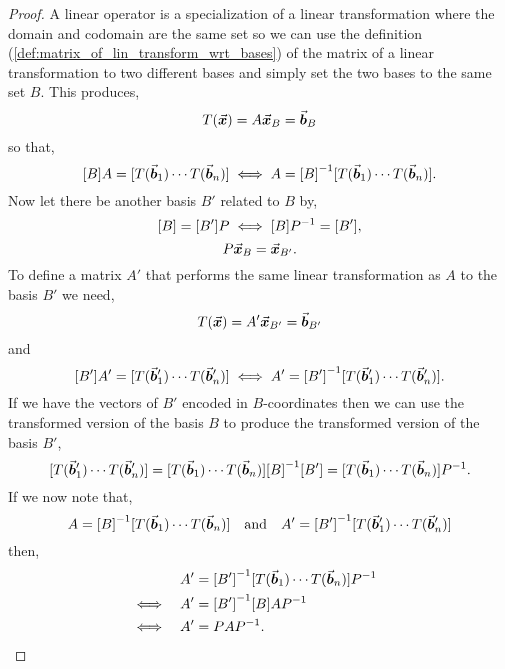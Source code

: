 \documentclass[../MathsNotesBase.tex]{subfiles}
\begin{document}
{		
		\bigskip
		\begin{proof}
			A linear operator is a specialization of a linear transformation where the domain and codomain are the same set so we can use the definition (\ref{def:matrix_of_lin_transform_wrt_bases}) of the matrix of a linear transformation \wrt to two different bases and simply set the two bases to the same set $B$. This produces,
			\[ T(\vec{\bm{x}}) = A\vec{\bm{x}}_B = \vec{\bm{b}}_B \]
			so that,
			\[ [B]A = [T(\vec{\bm{b}}_1) \cdots T(\vec{\bm{b}}_n)] \iff A = {[B]}^{-1}[T(\vec{\bm{b}}_1) \cdots T(\vec{\bm{b}}_n)]. \]		
			Now let there be another basis $B'$ related to $B$ by,
			\[ [B] = [B']P \iff [B]{P}^{-1} = [B'], \]
			\[ P\vec{\bm{x}}_B = \vec{\bm{x}}_{B'}. \]
			To define a matrix $A'$ that performs the same linear transformation as $A$ \wrt to the basis $B'$ we need,
			\[ T(\vec{\bm{x}}) = A'\vec{\bm{x}}_{B'} = \vec{\bm{b}}_{B'} \]
			and
			\[ [B']A' = [T(\vec{\bm{b}}_1') \cdots T(\vec{\bm{b}}_n')] \iff A' = {[B']}^{-1}[T(\vec{\bm{b}}_1') \cdots T(\vec{\bm{b}}_n')]. \]
			If we have the vectors of $B'$ encoded in $B$-coordinates then we can use the transformed version of the basis $B$ to produce the transformed version of the basis $B'$,
			\[ [T(\vec{\bm{b}}_1') \cdots T(\vec{\bm{b}}_n')] = [T(\vec{\bm{b}}_1) \cdots T(\vec{\bm{b}}_n)]{[B]}^{-1}[B'] = [T(\vec{\bm{b}}_1) \cdots T(\vec{\bm{b}}_n)]{P}^{-1}. \]
			If we now note that,
			\[ A = {[B]}^{-1}[T(\vec{\bm{b}}_1) \cdots T(\vec{\bm{b}}_n)] \hspace{10pt}\text{and}\hspace{10pt} A' = {[B']}^{-1}[T(\vec{\bm{b}}_1') \cdots T(\vec{\bm{b}}_n')]  \]
			then,
			\begin{align*}
			&& A' &= {[B']}^{-1}[T(\vec{\bm{b}}_1) \cdots T(\vec{\bm{b}}_n)]{P}^{-1} \\
			&\iff & A' &= {[B']}^{-1}[B]A{P}^{-1} &\text{\scriptsize{}} \\
			&\iff & A' &= PA{P}^{-1}. &\text{\scriptsize{}} \qedhere
			\end{align*}
		\end{proof}
	
		\bigskip
}
\end{document}
